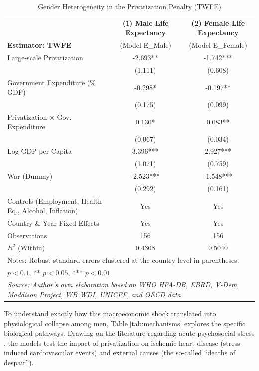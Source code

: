 \documentclass[en,magisterska]{pracamgr}
\begin{document}
\begin{table}[H]
\centering
\caption{Gender Heterogeneity in the Privatization Penalty (TWFE)}
\label{tab:gender_twfe}
\footnotesize
\begin{tabular}{l c c}
\toprule
 & \textbf{(1) Male Life Expectancy} & \textbf{(2) Female Life Expectancy} \\
\textbf{Estimator: TWFE} & (Model E\_Male) & (Model E\_Female) \\
\midrule
Large-scale Privatization & -2.693** & -1.742*** \\
 & (1.111) & (0.608) \\
Government Expenditure (\% GDP) & -0.298* & -0.197** \\
 & (0.175) & (0.099) \\
Privatization $\times$ Gov. Expenditure & 0.130* & 0.083** \\
 & (0.067) & (0.034) \\
Log GDP per Capita & 3.396*** & 2.927*** \\
 & (1.071) & (0.759) \\
War (Dummy) & -2.523*** & -1.548*** \\
 & (0.292) & (0.161) \\
\midrule
Controls (Employment, Health Eq., Alcohol, Inflation) & Yes & Yes \\
Country \& Year Fixed Effects & Yes & Yes \\
Observations & 156 & 156 \\
$R^2$ (Within) & 0.4308 & 0.5040 \\
\bottomrule
\multicolumn{3}{l}{\scriptsize Notes: Robust standard errors clustered at the country level in parentheses.} \\
\multicolumn{3}{l}{\scriptsize * $p < 0.1$, ** $p < 0.05$, *** $p < 0.01$} \\
\multicolumn{3}{l}{\scriptsize \textit{Source: Author's own elaboration based on WHO HFA-DB, EBRD, V-Dem, Maddison Project, WB WDI, UNICEF, and OECD data.}} \\
\end{tabular}
\end{table}

To understand exactly how this macroeconomic shock translated into physiological collapse among men, Table \ref{tab:mechanisms} explores the specific biological pathways. Drawing on the literature 
regarding acute psychosocial stress \citep{Leon1998}, the models test the impact of privatization on ischemic heart disease (stress-induced cardiovascular events) and external causes (the so-called ``deaths 
of despair''). 
\end{document}
